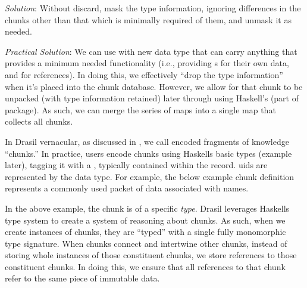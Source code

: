 \begin{writingdirectives}
      \item \textit{Solution}: Without discard, mask the type information,
            ignoring differences in the chunks other than that which is
            minimally required of them, and unmask it as needed.

      \item \textit{Practical Solution}: We can use \ExistentialQuantification{}
            with new data type that can carry anything that provides a minimum
            needed functionality (i.e., providing \UID{}s for their own data,
            and for references). In doing this, we effectively ``drop the type
            information'' when it's placed into the chunk database. However, we
            allow for that chunk to be unpacked (with type information retained)
            later through using Haskell's  (part of
             package). As such, we can merge the series of maps
            into a single map that collects all chunks.

\end{writingdirectives}

In Drasil vernacular, as discussed in , we call encoded
fragments of knowledge ``chunks.'' In practice, users encode chunks using
Haskells basic  types (example later), tagging it with a
, typically contained within the record. \acsp{uid} are represented by
the \UID{} data type. For example,  the below example chunk definition represents a
commonly used packet of data associated with names.


In the above example, the chunk is of a specific \textit{type}. Drasil leverages
Haskells type system to create a system of reasoning about chunks. As such, when
we create instances of chunks, they are ``typed'' with a single fully
monomorphic type signature. When chunks connect and intertwine other chunks,
instead of storing whole instances of those constituent chunks, we store \UID{}
references to those constituent chunks. In doing this, we ensure that all
references to that chunk refer to the same piece of immutable data. 


